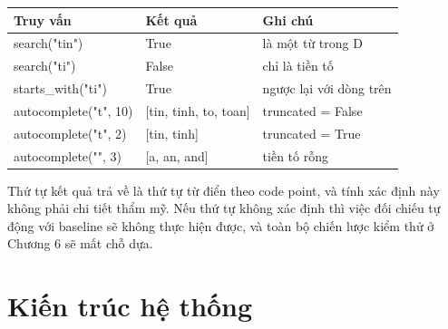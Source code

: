 {\footnotesize\singlespacing
\begin{longtable}[]{@{}
  >{\raggedright\arraybackslash}p{}
  >{\raggedright\arraybackslash}p{}
  >{\raggedright\arraybackslash}p{}@{}}
\toprule\noalign{}
\begin{minipage}[b]{\linewidth}\raggedright
Truy vấn
\end{minipage} & \begin{minipage}[b]{\linewidth}\raggedright
Kết quả
\end{minipage} & \begin{minipage}[b]{\linewidth}\raggedright
Ghi chú
\end{minipage} \\
\midrule\noalign{}
\endhead
\bottomrule\noalign{}
\endlastfoot
search("tin") & True & là một từ trong D \\
search("ti") & False & chỉ là tiền tố \\
starts\_with("ti") & True & ngược lại với dòng trên \\
autocomplete("t", 10) & {[}tin, tinh, to, toan{]} & truncated = False \\
autocomplete("t", 2) & {[}tin, tinh{]} & truncated = True \\
autocomplete("", 3) & {[}a, an, and{]} & tiền tố rỗng \\
\end{longtable}
}

Thứ tự kết quả trả về là thứ tự từ điển theo code point, và tính xác
định này không phải chi tiết thẩm mỹ. Nếu thứ tự không xác định thì việc
đối chiếu tự động với baseline sẽ không thực hiện được, và toàn bộ chiến
lược kiểm thử ở Chương 6 sẽ mất chỗ dựa.

\section{Kiến trúc hệ thống}
\label{sec:1-4}

